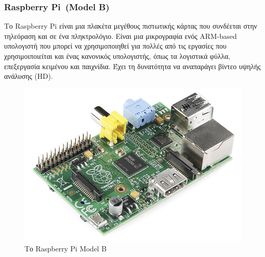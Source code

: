 \documentclass[12pt, a4paper, oneside]{report}
\begin{document}
\subsubsection{Raspberry Pi~(Model B)}

Το Raspberry Pi είναι μια πλακέτα μεγέθους πιστωτικής κάρτας που συνδέεται στην τηλεόραση και σε ένα πληκτρολόγιο. Είναι μια μικρογραφία ενός ARM-based υπολογιστή που μπορεί να χρησιμοποιηθεί για πολλές από τις εργασίες που χρησιμοιποιείται και ένας κανονικός υπολογιστής, όπως τα λογιστικά φύλλα, επεξεργασία κειμένου και παιχνίδια. Έχει τη δυνατότητα να αναπαράγει βίντεο υψηλής ανάλυσης (HD).
\clearpage
\begin{figure}[!htb]
\centering
\includegraphics[scale=0.6]{img_rasp}
\caption[Το Raspberry Pi Model B]{Το Raspberry Pi Model B\cite{raspberry}}
\end{figure}
\end{document}
